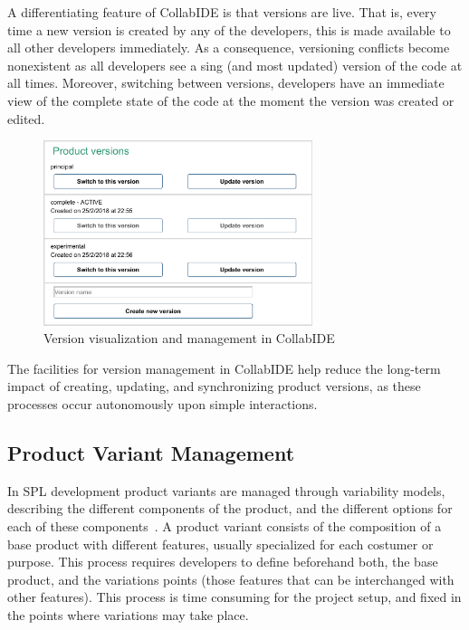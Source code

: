 A differentiating feature of CollabIDE is that versions are live. That is, every time a new version is 
created by any of the developers, this is made available to all other developers immediately. 
As a consequence, versioning conflicts become nonexistent as all developers see a sing (and most 
updated) version of the code at all times. Moreover, switching between versions, developers have an 
immediate view of the complete state of the code at the moment the version was created or edited. 

\begin{figure}[tbp]
  \centering
  \includegraphics[width=0.7\textwidth]{img/fig4-collabIDEVersionManagement}
  \caption{Version visualization and management in CollabIDE}
  \label{fig:versions}
\end{figure}

The facilities for version management in CollabIDE help reduce the long-term impact of creating, 
updating, and synchronizing product versions, as these processes occur autonomously upon simple 
interactions.

\subsection{Product Variant Management}
\label{sec:product-variant}
In \ac{SPL} development product variants are managed through variability models, describing the 
different components of the product, and the different options for each of these 
components~\cite{pohl05}. A product variant consists of the composition of a base product with 
different features, usually specialized for each costumer or purpose. This process requires developers 
to define beforehand both, the base product, and the variations points (\ie those features that can be 
interchanged with other features). This process is time consuming for the project setup, and fixed in 
the points where variations may take place.

